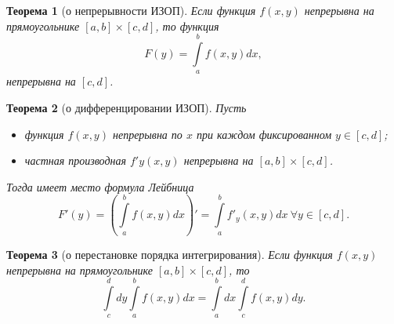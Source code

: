 \documentclass[a4paper, 12pt]{report}
\numberwithin{equation}{section}
\newtheorem*{theorem}{Теорема}
\begin{document}
	\begin{theorem}
		[о непрерывности ИЗОП]
		Если функция $f(x,y)$ непрерывна на прямоугольнике $[a,b]\times [c,d]$, то функция 
		\begin{equation*}
			F(y) = \int\limits_a^b f(x,y)dx,
		\end{equation*}
		непрерывна на $[c,d]$.
	\end{theorem}
	\begin{theorem}
		[о дифференцировании ИЗОП]
		Пусть
		\begin{itemize}
			\item функция $f(x,y)$ непрерывна по $x$ при каждом фиксированном $y \in [c,d]$;
			\item частная производная $f'y(x,y)$ непрерывна на $[a,b]\times [c,d]$.
		\end{itemize}
		Тогда имеет место формула Лейбница
		\begin{equation}
			F'(y) = \left(\int\limits_a^b f(x,y)dx\right)'  = \int\limits_a^b f'_y(x,y)dx\ \forall y \in [c,d].
		\end{equation}
	\end{theorem}
	\begin{theorem}
		[о перестановке порядка интегрирования]
		Если функция $f(x,y)$ непрерывна на прямоугольнике $[a,b]\times [c,d]$, то \begin{equation}
			\int\limits_c^d dy \int\limits_a^b f(x,y)dx = \int\limits_a^b dx \int\limits_c^d f(x,y)dy.
		\end{equation}
	\end{theorem}
	
\end{document}
